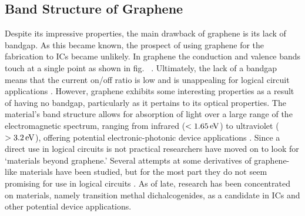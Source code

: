 \subsection{Band Structure of Graphene}\label{subsec:graphene_bandstructure}
Despite its impressive properties, the main drawback of graphene is its lack of bandgap. As this became known, the prospect of using graphene for the fabrication to \acp{IC} became unlikely. In graphene the conduction and valence bands touch at a single point as shown in fig.~ \cite{Wallace_PhysRev1947}. Ultimately, the lack of a bandgap means that the current on/off ratio is low and is unappealing for logical circuit applications \cite{Xu_ChemRev2013}. However, graphene exhibits some interesting properties as a result of having no bandgap, particularly as it pertains to its optical properties. The material's band structure allows for absorption of light over a large range of the electromagnetic spectrum, ranging from infrared ($<1.65\,\mathrm{eV}$) to ultraviolet ($>3.2\,\mathrm{eV}$), offering potential electronic-photonic device applications \cite{Xia_NatureNano2009,Wang_Science2008,Geim_NatureComm2011}. Since a direct use in logical circuits is not practical researchers have moved on to look for `\td materials beyond graphene.' Several attempts at some derivatives of graphene-like materials have been studied, but for the most part they do not seem promising for use in logical circuits \cite{Takeda_PhysRev1994,Cahangirov_PhysRevLett2009}. As of late, research has been concentrated on \td materials, namely transition methal dichalcogenides, as a candidate in \acp{IC} and other potential device applications.

